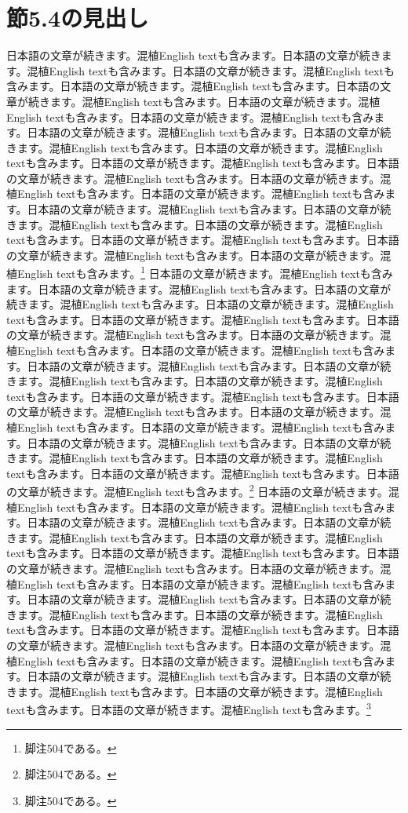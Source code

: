 \documentclass[pdflatex,book]{jlreq}
\begin{document}
\section{節5.4の見出し}
日本語の文章が続きます。混植English textも含みます。日本語の文章が続きます。混植English textも含みます。日本語の文章が続きます。混植English textも含みます。日本語の文章が続きます。混植English textも含みます。日本語の文章が続きます。混植English textも含みます。日本語の文章が続きます。混植English textも含みます。日本語の文章が続きます。混植English textも含みます。日本語の文章が続きます。混植English textも含みます。日本語の文章が続きます。混植English textも含みます。日本語の文章が続きます。混植English textも含みます。日本語の文章が続きます。混植English textも含みます。日本語の文章が続きます。混植English textも含みます。日本語の文章が続きます。混植English textも含みます。日本語の文章が続きます。混植English textも含みます。日本語の文章が続きます。混植English textも含みます。日本語の文章が続きます。混植English textも含みます。日本語の文章が続きます。混植English textも含みます。日本語の文章が続きます。混植English textも含みます。日本語の文章が続きます。混植English textも含みます。日本語の文章が続きます。混植English textも含みます。\footnote{脚注504である。}
日本語の文章が続きます。混植English textも含みます。日本語の文章が続きます。混植English textも含みます。日本語の文章が続きます。混植English textも含みます。日本語の文章が続きます。混植English textも含みます。日本語の文章が続きます。混植English textも含みます。日本語の文章が続きます。混植English textも含みます。日本語の文章が続きます。混植English textも含みます。日本語の文章が続きます。混植English textも含みます。日本語の文章が続きます。混植English textも含みます。日本語の文章が続きます。混植English textも含みます。日本語の文章が続きます。混植English textも含みます。日本語の文章が続きます。混植English textも含みます。日本語の文章が続きます。混植English textも含みます。日本語の文章が続きます。混植English textも含みます。日本語の文章が続きます。混植English textも含みます。日本語の文章が続きます。混植English textも含みます。日本語の文章が続きます。混植English textも含みます。日本語の文章が続きます。混植English textも含みます。日本語の文章が続きます。混植English textも含みます。日本語の文章が続きます。混植English textも含みます。\footnote{脚注504である。}
日本語の文章が続きます。混植English textも含みます。日本語の文章が続きます。混植English textも含みます。日本語の文章が続きます。混植English textも含みます。日本語の文章が続きます。混植English textも含みます。日本語の文章が続きます。混植English textも含みます。日本語の文章が続きます。混植English textも含みます。日本語の文章が続きます。混植English textも含みます。日本語の文章が続きます。混植English textも含みます。日本語の文章が続きます。混植English textも含みます。日本語の文章が続きます。混植English textも含みます。日本語の文章が続きます。混植English textも含みます。日本語の文章が続きます。混植English textも含みます。日本語の文章が続きます。混植English textも含みます。日本語の文章が続きます。混植English textも含みます。日本語の文章が続きます。混植English textも含みます。日本語の文章が続きます。混植English textも含みます。日本語の文章が続きます。混植English textも含みます。日本語の文章が続きます。混植English textも含みます。日本語の文章が続きます。混植English textも含みます。日本語の文章が続きます。混植English textも含みます。\footnote{脚注504である。}
\end{document}
